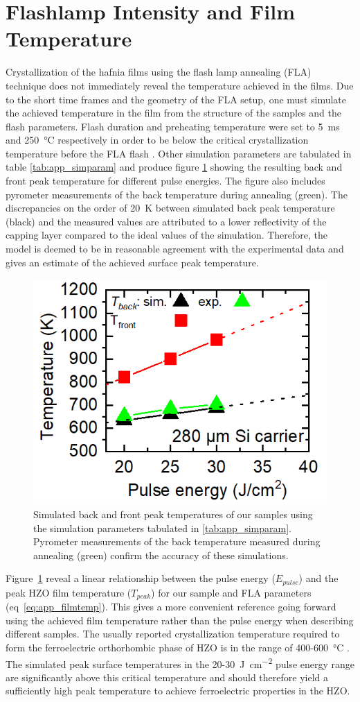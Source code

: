 \documentclass[11pt,twoside]{eitExjobb}
\begin{document}
\section{Flashlamp Intensity and Film Temperature}
Crystallization of the hafnia films using the flash lamp annealing (FLA)
technique does not immediately reveal the temperature achieved in the films. Due
to the short time frames and the geometry of the FLA setup, one must simulate
the achieved temperature in the film from the structure of the samples and the
flash parameters. Flash duration and preheating temperature were set to
\SI{5}{\milli\second} and \SI{250}{\celsius} respectively in order to be below
the critical crystallization temperature before the FLA
flash \cite{migita2019phase}. Other simulation parameters are tabulated in
table \ref{tab:app_simparam} and produce figure \ref{fig:res_Comsol} showing the
resulting back and front peak temperature for different pulse energies. The figure also
includes pyrometer measurements of the back temperature during annealing
(green). The discrepancies on the order of \SI{20}{\kelvin} between simulated
back peak temperature (black) and the measured values are attributed to a 
lower reflectivity of the  capping layer compared to the ideal values of
the simulation. Therefore, the model is deemed to be in reasonable agreement
with the experimental data and gives an estimate of the achieved surface peak temperature.

\begin{figure}[htbp]
    \centering
    \includegraphics[width=.41\linewidth]{fig/COMSOLFlashInt.png}
    \caption{Simulated back and front peak temperatures of our samples using the
    simulation parameters tabulated in \ref{tab:app_simparam}. Pyrometer
    measurements of the back temperature measured during annealing (green) confirm
    the accuracy of these simulations.}\label{fig:res_Comsol}
\end{figure}

Figure~\ref{fig:res_Comsol} reveal a linear relationship between the pulse
energy ($E_{pulse}$) and the peak HZO film temperature ($T_{peak}$) for our
sample and FLA parameters (eq~\ref{eq:app_filmtemp}). This gives a more
convenient reference going forward using the achieved film temperature rather
than the pulse energy when describing different samples. The usually reported
crystallization temperature required to form the ferroelectric orthorhombic
phase of HZO is in the range of 400-\SI{600}{\celsius}
\cite{muller2012ferroelectricity, athle2022improved}.
The simulated peak surface temperatures in the
20-\SI{30}{\joule\per\square\centi\meter} pulse energy range are significantly
above this critical temperature and should therefore yield a sufficiently high
peak temperature to achieve ferroelectric properties in the HZO.
\end{document}

